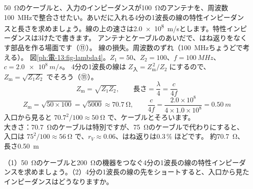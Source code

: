 \label{ph:電-13:ex11}
\begin{phreidai}[4分の1波長の線で整合させる]
\qty{50}{\ohm}のケーブルと、入力のインピーダンスが\qty{100}{\ohm}のアンテナを、周波数\qty{100}{MHz}で整合させたい。あいだに入れる4分の1波長の線の特性インピーダンスと長さを求めましょう。線の上の速さは\qty{2.0e8}{m/s}とします。特性インピーダンスは3けたで書きます。
\phbamen
アンテナとケーブルのあいだで、はね返りをなくす部品を作る場面です（⑪）。
\phmushi
線の損失。周波数のずれ（\qty{100}{MHz}ちょうどで考える）。
\phzu
図\ref{ph:電-13:fig-lambda4}。$Z_1=50$、$Z_2=100$、$f=\qty{100}{MHz}$、$c=\qty{2.0e8}{m/s}$。
\phriyu
4分の1波長の線は $Z_{\text{入}}=Z_{\mathrm m}^{\,2}/Z_2$ にするので、$Z_{\mathrm m}=\sqrt{Z_1Z_2}$ でそろう（⑪）。
\phtateru
\[Z_{\mathrm m}=\sqrt{Z_1Z_2},\qquad\text{長さ}=\frac{\lambda}{4}=\frac{c}{4f}\]
\phtoku
\[Z_{\mathrm m}=\sqrt{50\times100}=\sqrt{5000}\approx\qty{70.7}{\ohm},\qquad\frac{c}{4f}=\frac{2.0\times10^8}{4\times1.0\times10^8}=\qty{0.50}{m}\]
\phtashikame
入口から見ると $70.7^2/100\approx\qty{50}{\ohm}$ で、ケーブルとそろいます。\\
大きさ：\qty{70.7}{\ohm}のケーブルは特別ですが、\qty{75}{\ohm}のケーブルで代わりにすると、入口は $75^2/100\approx\qty{56}{\ohm}$ で、$r_V\approx0.06$、はね返りは0.3\,\% ほどです。
\kotae 約\qty{70.7}{\ohm}、長さ\qty{0.50}{m}
\end{phreidai}
\begin{jibun}
（1）\qty{50}{\ohm}のケーブルと\qty{200}{\ohm}の機器をつなぐ4分の1波長の線の特性インピーダンスを求めましょう。（2）4分の1波長の線の先をショートすると、入口から見たインピーダンスはどうなりますか。
\end{jibun}

